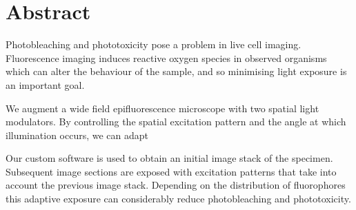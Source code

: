 \section*{Abstract}
\begin{summary}
Photobleaching and phototoxicity pose a problem in live cell
imaging. Fluorescence imaging induces reactive oxygen species in
observed organisms which can alter the behaviour of the sample, and so
minimising light exposure is an important goal.

We augment a wide field epifluorescence microscope with two spatial
light modulators. By controlling the spatial excitation pattern and
the angle at which illumination occurs, we can adapt  

Our custom software is used to obtain an initial image stack of the
specimen. Subsequent image sections are exposed with excitation
patterns that take into account the previous image stack. Depending on
the distribution of fluorophores this adaptive exposure can
considerably reduce photobleaching and phototoxicity.
\end{summary}
